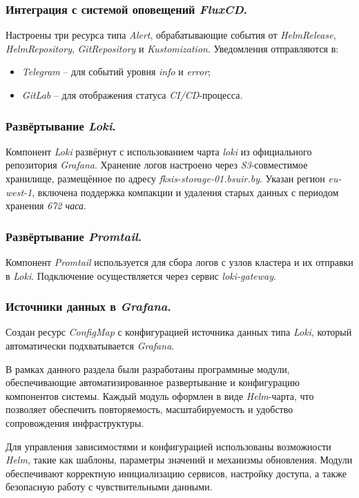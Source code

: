 \subsubsection{Интеграция с системой оповещений \textit{FluxCD}.} Настроены три ресурса типа \textit{Alert}, обрабатывающие события от \textit{HelmRelease}, \textit{HelmRepository}, \textit{GitRepository} и \textit{Kustomization}. Уведомления отправляются в:

\begin{itemize}
    \item \textit{Telegram} -- для событий уровня \textit{info} и \textit{error};
    \item \textit{GitLab} -- для отображения статуса \textit{CI/CD}-процесса.
\end{itemize}

\subsubsection{Развёртывание \textit{Loki}.} Компонент \textit{Loki} развёрнут с использованием чарта \textit{loki} из официального репозитория \textit{Grafana}. Хранение логов настроено через \textit{S3}-совместимое хранилище, размещённое по адресу \textit{fksis-storage-01.bsuir.by}. Указан регион \textit{eu-west-1}, включена поддержка компакции и удаления старых данных с периодом хранения \textit{672 часа}.

\subsubsection{Развёртывание \textit{Promtail}.} Компонент \textit{Promtail} используется для сбора логов с узлов кластера и их отправки в \textit{Loki}. Подключение осуществляется через сервис \textit{loki-gateway}.

\subsubsection{Источники данных в \textit{Grafana}.} Создан ресурс \textit{ConfigMap} с конфигурацией источника данных типа \textit{Loki}, который автоматически подхватывается \textit{Grafana}.

В рамках данного раздела были разработаны программные модули, обеспечивающие автоматизированное развертывание и конфигурацию компонентов системы. Каждый модуль оформлен в виде \textit{Helm}-чарта, что позволяет обеспечить повторяемость, масштабируемость и удобство сопровождения инфраструктуры.

Для управления зависимостями и конфигурацией использованы возможности \textit{Helm}, такие как шаблоны, параметры значений и механизмы обновления. Модули обеспечивают корректную инициализацию сервисов, настройку доступа, а также безопасную работу с чувствительными данными.
